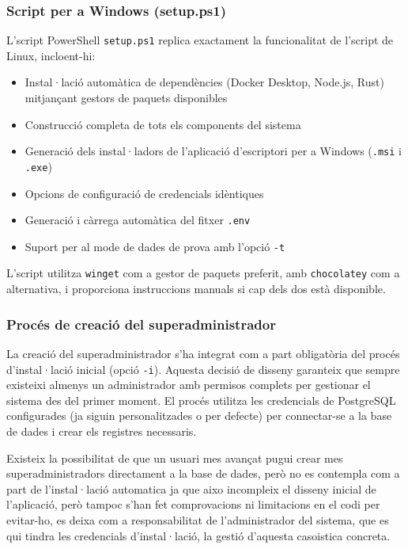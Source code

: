\subsubsection{Script per a Windows (setup.ps1)}

L'script PowerShell \texttt{setup.ps1} replica exactament la funcionalitat de l'script de Linux, incloent-hi:

\begin{itemize}
  \item Instal·lació automàtica de dependències (Docker Desktop, Node.js, Rust) mitjançant gestors de paquets disponibles
  \item Construcció completa de tots els components del sistema
  \item Generació dels instal·ladors de l'aplicació d'escriptori per a Windows (\texttt{.msi} i \texttt{.exe})
  \item Opcions de configuració de credencials idèntiques
  \item Generació i càrrega automàtica del fitxer \texttt{.env}
  \item Suport per al mode de dades de prova amb l'opció \texttt{-t}
\end{itemize}

L'script utilitza \texttt{winget} com a gestor de paquets preferit, amb \texttt{chocolatey} com a alternativa, i proporciona instruccions manuals si cap dels dos està disponible.

\subsubsection{Procés de creació del superadministrador}

La creació del superadministrador s'ha integrat com a part obligatòria del procés d'instal·lació inicial (opció \texttt{-i}). Aquesta decisió de disseny garanteix que sempre existeixi almenys un administrador amb permisos complets per gestionar el sistema des del primer moment. El procés utilitza les credencials de PostgreSQL configurades (ja siguin personalitzades o per defecte) per connectar-se a la base de dades i crear els registres necessaris.

Existeix la possibilitat de que un usuari mes avançat pugui crear mes superadministradors directament a la base de dades, però no es contempla com a part de l'instal·lació automatica ja que aixo incompleix el disseny inicial de l'aplicació, però tampoc s'han fet comprovacions ni limitacions en el codi per evitar-ho, es deixa com a responsabilitat de l'administrador del sistema, que es qui tindra les credencials d'instal·lació, la gestió d'aquesta casoistica concreta.


